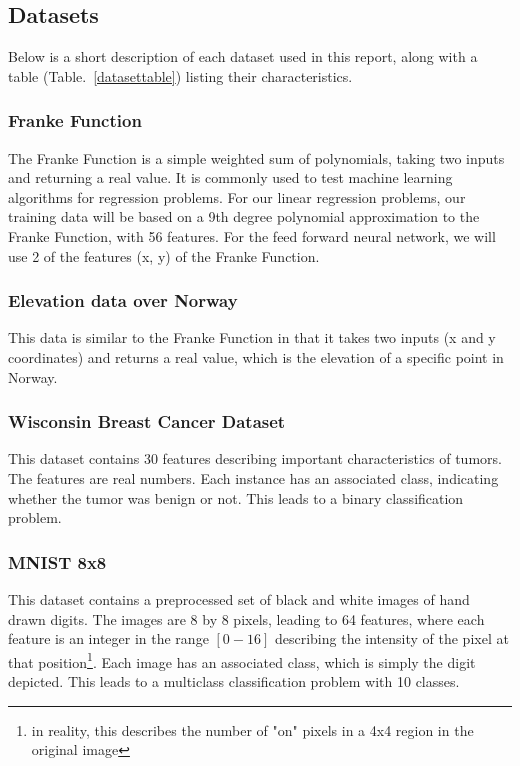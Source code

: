 \documentclass[onecolumn,10pt,cleanfoot]{asme2ej}
\begin{document}
\subsection{Datasets}

Below is a short description of each dataset used in this report, along with a table (Table.~\ref{datasettable}) listing their characteristics.

\subsubsection{Franke Function}

The Franke Function is a simple weighted sum of polynomials, taking two inputs and returning a real value. It is commonly used to test machine learning algorithms for regression problems. For our linear regression problems, our training data will be based on a 9th degree polynomial approximation to the Franke Function, with 56 features. For the feed forward neural network, we will use 2 of the features (x, y) of the Franke Function.

\subsubsection{Elevation data over Norway}

This data is similar to the Franke Function in that it takes two inputs (x and y coordinates) and returns a real value, which is the elevation of a specific point in Norway.

\subsubsection{Wisconsin Breast Cancer Dataset}

This dataset contains 30 features describing important characteristics of tumors. The features are real numbers. Each instance has an associated class, indicating whether the tumor was benign or not. This leads to a binary classification problem.

\subsubsection{MNIST 8x8}

This dataset contains a preprocessed set of black and white images of hand drawn digits. The images are 8 by 8 pixels, leading to 64 features, where each feature is an integer in the range $[0-16]$ describing the intensity of the pixel at that position\footnote{in reality, this describes the number of "on" pixels in a 4x4 region in the original image}. Each image has an associated class, which is simply the digit depicted. This leads to a multiclass classification problem with 10 classes.
\end{document}
